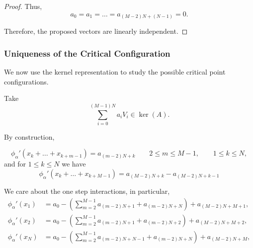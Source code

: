 \documentclass{article}
\begin{document}
\begin{proof}
Thus,
\[
a_0
=
a_1
=
\dots
=
a_{(M-2)N+(N-1)}
=
0.
\]

Therefore, the proposed vectors are linearly independent.
\end{proof}

\subsubsection{Uniqueness of the Critical Configuration}

We now use the kernel representation to study the possible critical point configurations.

Take
\[
\sum_{i=0}^{(M-1)N}a_iV_i
\in\ker(A).
\]

By construction,

\[\phi_\alpha'(x_k+\dots+x_{k+m-1})=a_{(m-2)N+k}
\qquad 2\leq m\leq M-1,
\qquad
1\leq k\leq N,\]
and for $1\leq k\leq N$ we have 
\[\phi_\alpha'(x_k+\dots+x_{k+M-1})
=a_{(M-2)N+k}-a_{(M-2)N+k-1}\]

We care about the one step interactions, in particular, 
\begin{align*}
\phi_\alpha'(x_1) &=a_0-\left(\sum_{m=2}^{M-1}a_{(m-2)N+1}+a_{(m-2)N+N}\right)+a_{(M-2)N+M+1}, \\
\phi_\alpha'(x_2)&=a_0-\left(\sum_{m=2}^{M-1}a_{(m-2)N+1}+a_{(m-2)N+2}\right)+a_{(M-2)N+M+2}, \\
\phi_\alpha'(x_N)&=a_0-\left(\sum_{m=2}^{M-1}a_{(m-2)N+N-1}+a_{(m-2)N+N}\right)+a_{(M-2)N+M},\\
\end{align*}
\end{document}
